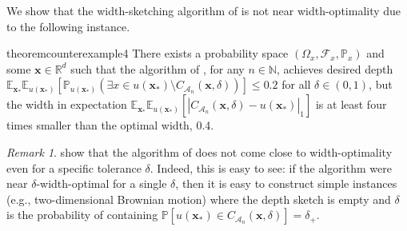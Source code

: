 \documentclass{article} %
\theoremstyle{remark}
\newtheorem{remark}{Remark}[section]
\theoremstyle{definition}      %
\begin{document}
We show that the width-sketching algorithm of \cite{angelopoulos2024conformal} is not near width-optimality due to the following instance.
\begin{restatable}{theorem}{counterexample4}\label{prop:counterexample4}
  There exists a probability space $(\Omega_x, \mathcal{F}_x,\mathbb{P}_x)$ and some $\bm{x} \in \mathbb{R}^d$ such that the algorithm of \cite{angelopoulos2024conformal}, for any $n \in \mathbb{N}$, achieves desired depth $\mathbb{E}_{\bm{x}_*} \mathbb{E}_{u(\bm{x_*})}[\mathbb{P}_{u(\bm{x_*})}(\exists x \in u(\bm{x_*}) \setminus C_{\mathcal{A}_n}(\bm{x},\delta))]  \leq 0.2$ for all $\delta \in (0,1)$, but the width in expectation $\mathbb{E}_{\bm{x}_*} \mathbb{E}_{u(\bm{x_*})}[|C_{\mathcal{A}_n}(\bm{x},\delta) - u(\bm{x_*})|_1]$ is at least four times smaller than the optimal width, 0.4.
\end{restatable}
\begin{remark}
   show that the algorithm of \cite{angelopoulos2024conformal} does not come close to width-optimality even for a specific tolerance $\delta$. Indeed, this is easy to see: if the algorithm were near $\delta$-width-optimal for a single $\delta$, then it is easy to construct simple instances (e.g., two-dimensional Brownian motion) where the depth sketch is empty and $\delta$ is the probability of containing $\mathbb{P}[u(\bm{x_*}) \in C_{\mathcal{A}_n}(\bm{x},\delta)]=\delta_{+}$.  
\end{remark}
\end{document}

